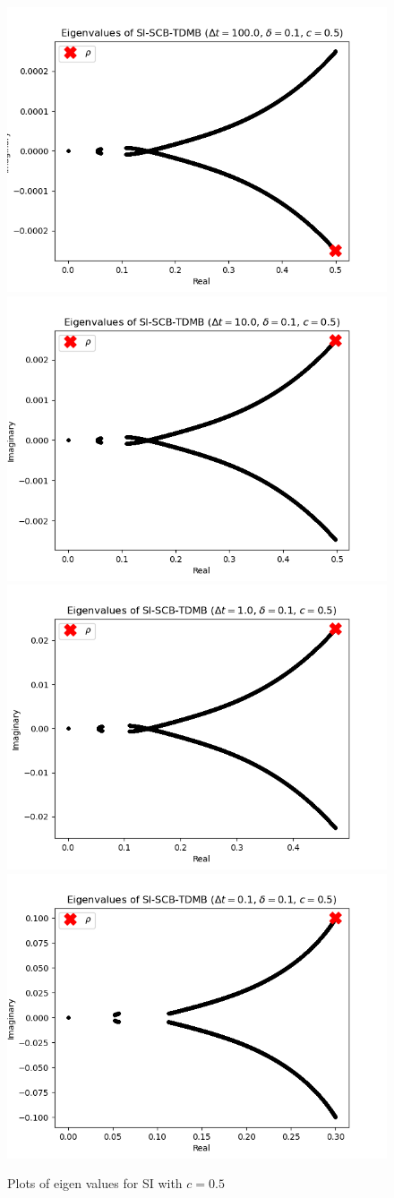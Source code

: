 \begin{figure}
    \includegraphics[width=.24\textwidth]{appendix/eig_plots/si/c0.5/mfp0.1dt100.0c0.5.png}
    \includegraphics[width=.24\textwidth]{appendix/eig_plots/si/c0.5/mfp0.1dt10.0c0.5.png}
    \includegraphics[width=.24\textwidth]{appendix/eig_plots/si/c0.5/mfp0.1dt1.0c0.5.png}
    \includegraphics[width=.24\textwidth]{appendix/eig_plots/si/c0.5/mfp0.1dt0.1c0.5.png}
    
    \caption{Plots of eigen values for SI with $c=0.5$}
    \label{appendix:sic5}
\end{figure}

